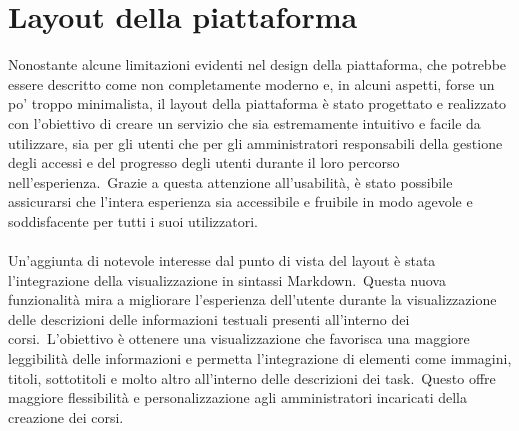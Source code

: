 \section{Layout della piattaforma}\label{sec:cap_sec_subsec}
Nonostante alcune limitazioni evidenti nel design della piattaforma, che potrebbe essere descritto come non completamente moderno e, 
in alcuni aspetti, forse un po' troppo minimalista, il layout della piattaforma è stato progettato e realizzato con l'obiettivo di 
creare un servizio che sia estremamente intuitivo e facile da utilizzare, sia per gli utenti 
che per gli amministratori responsabili della gestione degli accessi e del progresso degli utenti 
durante il loro percorso nell'esperienza.\ Grazie a questa attenzione all'usabilità, 
è stato possibile assicurarsi che l'intera esperienza sia accessibile e fruibile in modo agevole 
e soddisfacente per tutti i suoi utilizzatori.
\\ \\
Un'aggiunta di notevole interesse dal punto di vista del layout è stata l'integrazione 
della visualizzazione in sintassi Markdown.\ Questa nuova funzionalità mira a migliorare 
l'esperienza dell'utente durante la visualizzazione delle descrizioni delle informazioni 
testuali presenti all'interno dei corsi.\ L'obiettivo è ottenere una visualizzazione che 
favorisca una maggiore leggibilità delle informazioni e permetta l'integrazione di 
elementi come immagini, titoli, sottotitoli e molto altro all'interno delle descrizioni 
dei task.\ Questo offre maggiore flessibilità e personalizzazione agli amministratori 
incaricati della creazione dei corsi.

